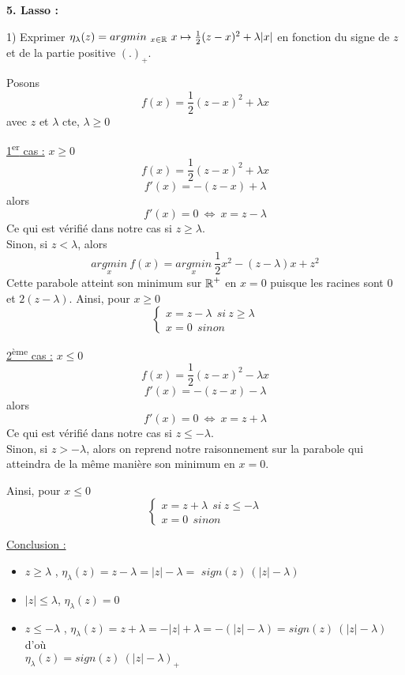 \vspace{5mm}

{\fontsize{12pt}{22pt} \textbf{5. Lasso :}\par}

\vspace{5mm}

1) Exprimer $\eta_{\lambda}(z) = arg min_{\ x \in \R} \ x \mapsto \frac{1}{2}(z-x)^2 + \lambda|x|$ en fonction du signe de $z$ et de la partie positive $(.)_{+}$.

\bigskip
Posons 
$$f(x) = \frac{1}{2}(z-x)^2 + \lambda x$$ 
avec $z$ et $\lambda$ cte, $\lambda \geqslant 0$
\medskip

\underline{1\textsuperscript{er} cas :} $x \geqslant 0$ 
   $$f(x) = \frac{1}{2}(z-x)^2 + \lambda x$$
   $$f'(x)= -(z-x) + \lambda$$
alors $$f'(x) = 0 \ \Leftrightarrow \ x = z - \lambda$$
Ce qui est vérifié dans notre cas si $z \geqslant \lambda$. \\
Sinon, si $z < \lambda$, alors 
$$\underset{x}{argmin} \ f(x) = \underset{x}{argmin} \ \frac{1}{2} x^2 - (z-\lambda)x + z^2$$
Cette parabole atteint son minimum sur $\operatorname{\mathbb{R}}^+$ en $x = 0$ puisque les racines sont $0$ et $2(z-\lambda)$.
\smallskip
Ainsi, pour $x \geqslant 0$
$$\begin{cases}
    x = z - \lambda \ \ si \ z \geqslant \lambda \\
    x = 0 \ \ sinon
\end{cases}$$


\underline{2\textsuperscript{ème} cas :} $x \leqslant 0$ 
   $$f(x) = \frac{1}{2}(z-x)^2 - \lambda x$$
   $$f'(x)= -(z-x) - \lambda$$
alors $$f'(x) = 0 \ \Leftrightarrow \ x = z + \lambda$$
Ce qui est vérifié dans notre cas si $z \leqslant - \lambda$. \\
Sinon, si $z > - \lambda$, alors on reprend notre raisonnement sur la parabole qui atteindra de la même manière son minimum en $x=0$.

\smallskip
Ainsi, pour $x \leqslant 0$
$$\begin{cases}
    x = z + \lambda \ \ si \ z \leqslant - \lambda \\
    x = 0 \ \ sinon
\end{cases}$$

\bigskip

\underline{Conclusion :} 
\begin{itemize}
    \item \boldmath $z \geqslant \lambda$ \unboldmath, $ \eta_{\lambda}(z) = z - \lambda = |z| - \lambda = $ \boldmath $sign(z) \ (|z| - \lambda) $ \unboldmath
    \item \boldmath $|z| \leqslant \lambda$, $ \eta_{\lambda}(z) = 0$ \unboldmath
    \item \boldmath $z \leqslant - \lambda$ \unboldmath, $\eta_{\lambda}(z) = z + \lambda = - |z| + \lambda = - (|z| - \lambda) = sign(z) \ (|z| - \lambda)$ d'où \\ \boldmath $\eta_{\lambda}(z) = sign(z) \ (|z| - \lambda)_{+}$ \unboldmath 
\end{itemize}

